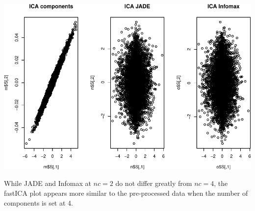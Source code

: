 \documentclass[12pt,twoside]{amherstthesis}
\begin{document}
  \begin{Shaded}
  \begin{Highlighting}[]
  \StringTok{ }\NormalTok{,}\NormalTok{,}\NormalTok{,}\NormalTok{)}
  
  \StringTok{ }\NormalTok{,}\NormalTok{,}\NormalTok{,}\NormalTok{,}\NormalTok{,}\NormalTok{)}
  
  \NormalTok{(} \NormalTok{(}\NormalTok{,}\NormalTok{))}
  \OperatorTok{$} \NormalTok{)}
  \OperatorTok{$} \NormalTok{)}
  \OperatorTok{$}\NormalTok{)}
  \end{Highlighting}
  \end{Shaded}
  
  \begin{center}\includegraphics{ICA_Stats_Comps_files/figure-latex/unnamed-chunk-3-1} \end{center}
  
  While JADE and Infomax at \(nc=2\) do not differ greatly from \(nc=4\),
  the fastICA plot appears more similar to the pre-processed data when the
  number of components is set at 4.
  
\end{document}
